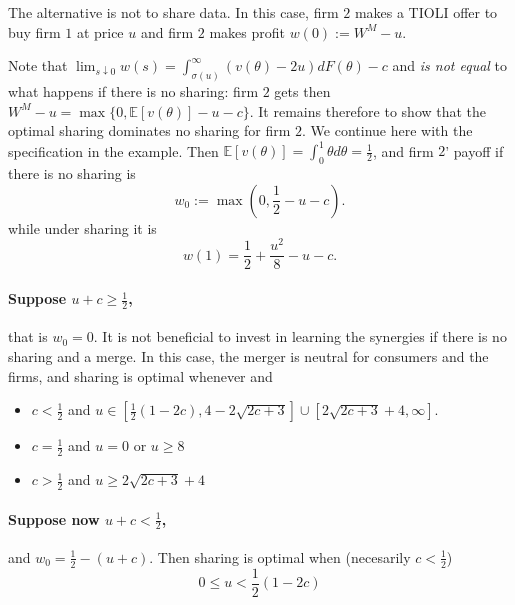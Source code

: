 \documentclass[a4paper,leqno]{article}%
\newcommand{\E}{\mathbb E}
\renewcommand{\t}{\theta}
\newcommand{\s}{\sigma}
\begin{document}
The alternative is not to share data. In this case, firm $2$ makes a TIOLI offer to buy firm $1$ at price $u$ and firm $2$ makes profit $w(0):=W^M-u$. 

Note that $\lim_{s\downarrow 0}w(s)=\int_{\s(u)}^\infty (v(\t)-2u)dF(\t)-c$ and \emph{is not equal } to what happens if there is no sharing: firm $2$ gets then $W^M-u=\max\{0, \E[v(\t)]-u-c\}$. It remains therefore to show that the optimal sharing dominates no sharing for firm $2$. We continue here with the specification in the example. Then $\E[v(\t)]=\int_0^1 \t d\t=\frac{1}{2}$, and firm $2$' payoff if there is no sharing is 
%
\[
w_0:=\max(0,\frac{1}{2}-u-c).
\]
%
while under sharing it is 
%
\[
w(1) = \frac{1}{2}+\frac{u^2}{8}-u-c. 
\]
%

\paragraph{Suppose $u+c\geq \frac{1}{2}$,} that is $w_0=0$. It is not beneficial to invest in learning the synergies if there is no sharing and a merge. In this case, the merger is neutral for consumers and the firms, and sharing is optimal whenever  and 
%
\begin{itemize}
    \item $c<\frac{1}{2}$ and $u\in \left[\frac{1}{2} (1-2 c),4-2 \sqrt{2 c+3}\right]\cup [2 \sqrt{2c+3}+4,\infty]$.
    \item $c=\frac{1}{2}$ and $u=0$ or $u\geq 8 $
    \item $c>\frac{1}{2}$ and $u\geq 2\sqrt{2 c+3}+4$
\end{itemize}
%


\paragraph{Suppose now $u+c<\frac{1}{2}$,} and $w_0=\frac{1}{2}-(u+c)$. Then sharing is optimal when (necesarily $c<\frac{1}{2}$)
%
\[
    0\leq u<\frac{1}{2} (1-2 c)
\]




\end{document}
